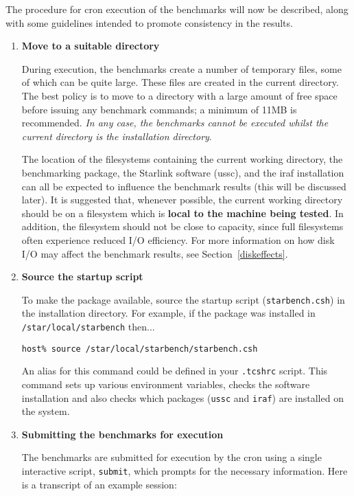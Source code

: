 The procedure for cron execution of the benchmarks will now be described, along
with some guidelines intended to promote consistency in the results.

\begin{enumerate}

\item {\bf Move to a suitable directory}

During execution, the benchmarks create a number of temporary files,
some of which can be quite large. These files are created in the
current directory. The best policy is to move to a directory with a
large amount of free space before issuing any benchmark commands; a
minimum of 11MB is recommended. {\em In any case, the benchmarks
cannot be executed whilst the current directory is the installation
directory}.

The location of the filesystems containing the current working
directory, the benchmarking package, the Starlink software (ussc), and
the iraf installation can all be expected to influence the benchmark
results (this will be discussed later).  It is suggested that, whenever
possible, the current working directory should be on a filesystem which
is {\bf local to the machine being tested}. In addition, the filesystem
should not be close to capacity, since full filesystems often
experience reduced I/O efficiency. For more information on how disk I/O
may affect the benchmark results, see Section~\ref{diskeffects}.


\item {\bf Source the startup script}

To make the package available, source the startup script ({\tt starbench.csh})
in the installation directory. For example, if the package was installed in
{\tt /star/local/starbench} then...

{\tt host\% source /star/local/starbench/starbench.csh}

An alias for this command could be defined in your {\tt .tcshrc} script. This
command sets up various environment variables, checks the software installation
and also checks which packages ({\tt ussc} and {\tt iraf}) are installed
on the system.


\item {\bf Submitting the benchmarks for execution}

The benchmarks are submitted for execution by the cron using a single
interactive script, {\tt submit}, which prompts for the necessary
information. Here is a transcript of an example session:


\end{enumerate}
